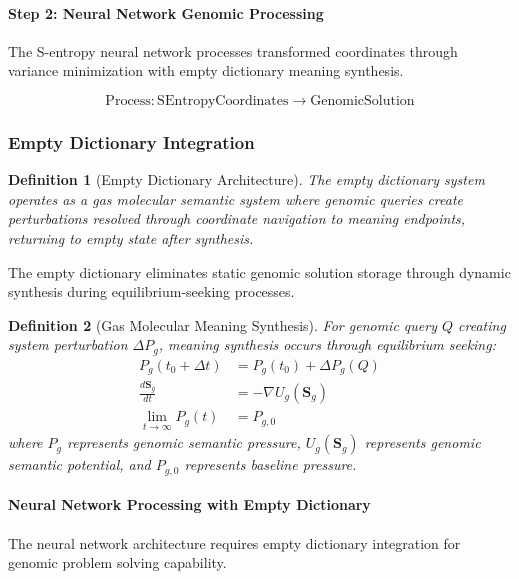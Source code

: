 \documentclass[12pt,a4paper]{article}
\newtheorem{definition}{Definition}
\begin{document}
\paragraph{Step 2: Neural Network Genomic Processing}

The S-entropy neural network processes transformed coordinates through variance minimization with empty dictionary meaning synthesis.

\begin{equation}
\text{Process}: \text{SEntropyCoordinates} \rightarrow \text{GenomicSolution}
\end{equation}

\subsubsection{Empty Dictionary Integration}

\begin{definition}[Empty Dictionary Architecture]
The empty dictionary system operates as a gas molecular semantic system where genomic queries create perturbations resolved through coordinate navigation to meaning endpoints, returning to empty state after synthesis.
\end{definition}

The empty dictionary eliminates static genomic solution storage through dynamic synthesis during equilibrium-seeking processes.

\begin{definition}[Gas Molecular Meaning Synthesis]
For genomic query $Q$ creating system perturbation $\Delta P_g$, meaning synthesis occurs through equilibrium seeking:
\begin{align}
P_g(t_0 + \Delta t) &= P_g(t_0) + \Delta P_g(Q) \\
\frac{d\mathbf{S}_g}{dt} &= -\nabla U_g(\mathbf{S}_g) \\
\lim_{t \to \infty} P_g(t) &= P_{g,0}
\end{align}
where $P_g$ represents genomic semantic pressure, $U_g(\mathbf{S}_g)$ represents genomic semantic potential, and $P_{g,0}$ represents baseline pressure.
\end{definition}

\paragraph{Neural Network Processing with Empty Dictionary}

The neural network architecture requires empty dictionary integration for genomic problem solving capability.
\end{document}
